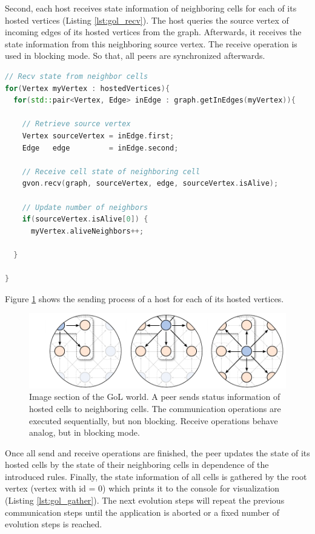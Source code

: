 \noindent Second, each host receives state information of
neighboring cells for each of its hosted vertices (Listing
\ref{lst:gol_recv}). The host queries the source vertex of incoming
edges of its hosted vertices from the graph. Afterwards, it receives the
state information from this neighboring source vertex.  The receive
operation is used in blocking mode. So that, all peers are
synchronized afterwards.

\begin{lstlisting}[language=C++, label=lst:gol_recv, caption={\ }]
// Recv state from neighbor cells
for(Vertex myVertex : hostedVertices){
  for(std::pair<Vertex, Edge> inEdge : graph.getInEdges(myVertex)){

    // Retrieve source vertex
    Vertex sourceVertex = inEdge.first;
    Edge   edge         = inEdge.second;

    // Receive cell state of neighboring cell    
    gvon.recv(graph, sourceVertex, edge, sourceVertex.isAlive);

    // Update number of neighbors
    if(sourceVertex.isAlive[0]) { 
      myVertex.aliveNeighbors++;

  }

}
\end{lstlisting}

\noindent Figure \ref{fig:gol_communication} shows the sending process of a host
for each of its hosted vertices.

\begin{figure}[H]
  \centering
  \includegraphics[width=\textwidth]{graphics/40_gol_communication}
  \caption{Image section of the GoL world. A peer sends status information of
    hosted cells to neighboring cells. The communication operations
    are executed sequentially, but non blocking. Receive operations
    behave analog, but in blocking mode.}
  \label{fig:gol_communication}
\end{figure}

\noindent Once all send and receive operations are finished, the peer
updates the state of its hosted cells by the state of their
neighboring cells in dependence of the introduced rules. Finally, the
state information of all cells is gathered by the root vertex (vertex
with id = 0) which prints it to the console for visualization (Listing
\ref{lst:gol_gather}). The next evolution steps will repeat the
previous communication steps until the application is aborted or a
fixed number of evolution steps is reached.

